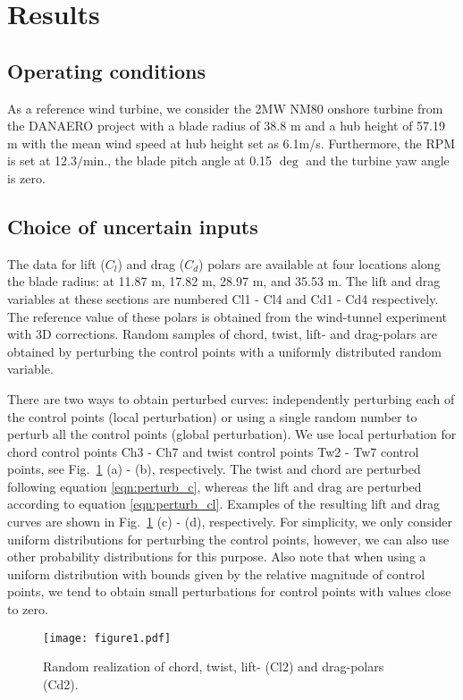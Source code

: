 \section{Results}\label{sec:results}

\subsection{Operating conditions}
As a reference wind turbine, we consider the 2MW NM80 onshore turbine from the DANAERO project \cite{Troldborg2013} with a blade radius of 38.8 m and a hub height of 57.19 m with the mean wind speed at hub height set as 6.1m/s. Furthermore, the RPM is set at 12.3$/\text{min.}$, the blade pitch angle at 0.15 $\deg$ and the turbine yaw angle is zero.

\subsection{Choice of uncertain inputs}
The data for lift ($C_l$) and drag ($C_d$) polars are available at four locations along the blade radius: at 11.87 m, 17.82 m, 28.97 m, and 35.53 m. The lift and drag variables at these sections are numbered Cl1 - Cl4 and Cd1 - Cd4 respectively. The reference value of these polars is obtained from the wind-tunnel experiment with 3D corrections. Random samples of chord, twist, lift- and drag-polars are obtained by perturbing the control points with a uniformly distributed random variable.  

There are two ways to obtain perturbed curves: independently perturbing each of the control points (local perturbation) or using a single random number to perturb all the control points (global perturbation). We use local perturbation for chord control points Ch3 - Ch7 and twist control points Tw2 - Tw7 control points, see Fig.\ \ref{perturbed_samples} (a) - (b), respectively. The twist and chord are perturbed following equation \eqref{eqn:perturb_c}, whereas the lift and drag are perturbed according to equation \eqref{eqn:perturb_cl}. Examples of the resulting lift and drag curves are shown in Fig.\ \ref{perturbed_samples} (c) - (d), respectively. For simplicity, we only consider uniform distributions for perturbing the control points, however, we can also use other probability distributions for this purpose. Also note that when using a uniform distribution with bounds given by the relative magnitude of control points, we tend to obtain small perturbations for control points with values close to zero. 
\begin{figure}[ht!]
\centering
\texttt{[image: figure1.pdf]}
\caption{Random realization of chord, twist, lift- (Cl2) and drag-polars (Cd2).}
\label{perturbed_samples}
\end{figure}

